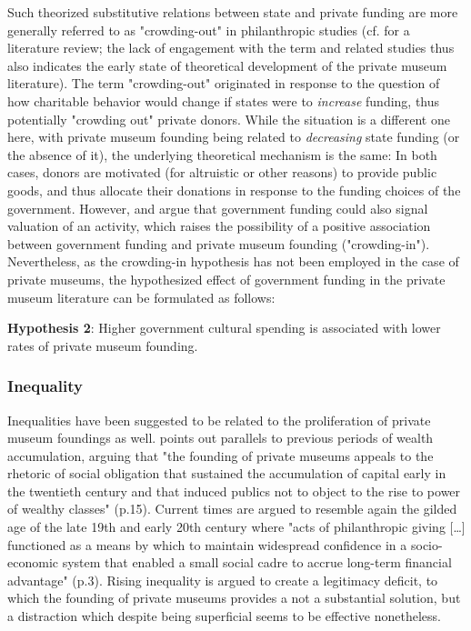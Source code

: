 \documentclass[11pt]{article}
\begin{document}
Such theorized substitutive relations between state and private funding are more generally referred to as "crowding-out" in philanthropic studies (cf. \cite{Bekkers_Wiepking_2010_literature} for a literature review;  the lack of engagement with the term and related studies thus also indicates the early state of theoretical development of the private museum literature).
The term "crowding-out" originated in response to the question of how charitable behavior would change if states were to \emph{increase} funding, thus potentially "crowding out" private donors.
While the situation is a different one here, with private museum founding being related to \emph{decreasing} state funding (or the absence of it), the underlying theoretical mechanism is the same:
In both cases, donors are motivated (for altruistic or other reasons) to provide public goods, and thus allocate their donations in response to the funding choices of the government.
However, \textcite{DeWit_etal_2018_philanthropy} and \textcite{Lena_2019_entitled} argue that government funding could also signal valuation of an activity, which raises the possibility of a positive association between government funding and private museum founding ("crowding-in").
Nevertheless, as the crowding-in hypothesis has not been employed in the case of private museums, the hypothesized effect of government funding in the private museum literature can be formulated as follows:  

\bigbreak
\noindent
\textbf{Hypothesis 2}: Higher government cultural spending is associated with lower rates of private museum founding.


\subsubsection*{Inequality}


Inequalities have been suggested to be related to the proliferation of private museum foundings as well. 
\textcite{Brown_2019_private} points out parallels to previous periods of wealth accumulation, arguing that "the founding of private museums appeals to the rhetoric of social obligation that sustained the accumulation of capital early in the twentieth century and that induced publics not to object to the rise to power of wealthy classes" (p.15).
Current times are argued to resemble again the gilded age of the late 19th and early 20th century where "acts of philanthropic giving [\ldots{}] functioned as a means by which to maintain widespread confidence in a socio-economic system that enabled a small social cadre to accrue long-term financial advantage" (p.3). 
Rising inequality is argued to create a legitimacy deficit, to which the founding of private museums provides a not a substantial solution, but a distraction which despite being superficial seems to be effective nonetheless.
\end{document}
